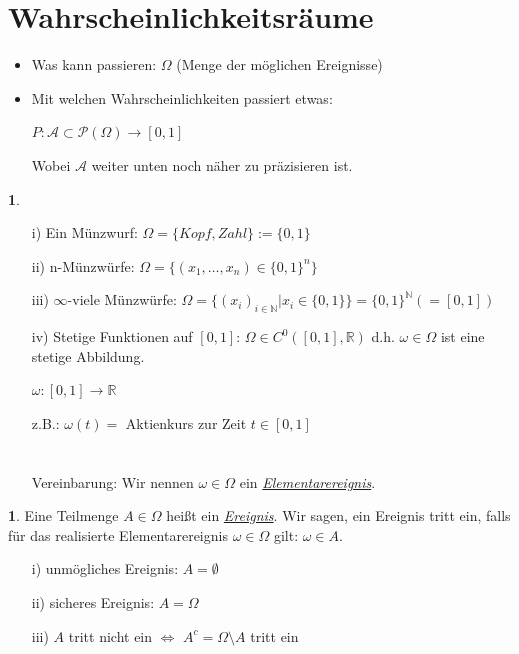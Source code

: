 \documentclass[10pt,a4paper]{report}
\numberwithin{equation}{section}
\numberwithin{figure}{section}
\theoremstyle{plain}
\theoremstyle{definition}
\newtheorem{defn}[thm]{\protect\definitionname}
\newtheorem{example}[thm]{\protect\examplename}
\theoremstyle{remark}
\theoremstyle{plain}
\providecommand{\definitionname}{Definition}
\providecommand{\examplename}{Beispiel}
\newcommand{\1}{ \mathbb{1} } %
\begin{document}
\section{Wahrscheinlichkeitsräume}
\label{sec:wraeume}
\begin{itemize}
\item Was kann passieren: $\Omega$ (Menge der möglichen Ereignisse)
\item Mit welchen Wahrscheinlichkeiten passiert etwas:
  \begin{center}
    $P: \mathcal{A} \subset \mathcal{P}(\Omega) \rightarrow [0,1]$
  \end{center}
  Wobei $\mathcal{A}$ weiter unten noch näher zu präzisieren ist.
\end{itemize}
\begin{example}
  \begin{itemize}
  \item[i)] Ein Münzwurf: $\Omega=\{Kopf, Zahl\}:=\{0,1\}$
  \item[ii)] n-Münzwürfe: $\Omega=\{(x_1,\dots,x_n) \in \{0,1\}^n\}$
  \item[iii)] $\infty$-viele Münzwürfe: $\Omega=\{(x_i)_{i\in \mathbb{N}}|x_i \in \{0,1\}\}=\{0,1\}^\mathbb{N}(=[0,1])$
  \item[iv)] Stetige Funktionen auf $[0,1]$: $\Omega \in
    C^0([0,1],\mathbb{R})$ d.h. $\omega \in \Omega$ ist eine stetige Abbildung.
    \begin{center}
      $\omega: [0,1] \rightarrow \mathbb{R}$
    \end{center}
    z.B.: $\omega(t)=$ Aktienkurs zur Zeit $t \in [0,1]$\\\\\\
    Vereinbarung: Wir nennen $\omega \in \Omega$ ein \underline{\textit{Elementarereignis}}.
  \end{itemize}
\end{example}
\begin{defn} %
  Eine Teilmenge $A \in \Omega$ heißt ein \underline{\textit{Ereignis}}. 
  Wir sagen, ein Ereignis tritt ein, falls für das realisierte Elementarereignis $\omega \in \Omega$ gilt: $\omega \in A$.
  \begin{itemize}
  \item[i)] unmögliches Ereignis: $A=\emptyset$
  \item[ii)] sicheres Ereignis: $A=\Omega$
  \item[iii)] $A$ tritt nicht ein $\Leftrightarrow$ $A^c=\Omega\setminus A$ tritt ein 
  \end{itemize}
\end{defn}
\end{document}
